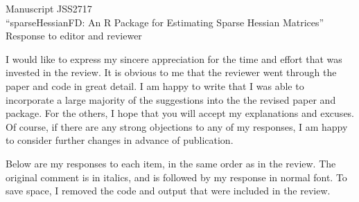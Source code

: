 \documentclass{article}
\begin{document}
{\bfseries
\begin{center}
  Manuscript JSS2717\\
 ``sparseHessianFD: An R Package for Estimating Sparse
 Hessian Matrices''\\
 \vspace{\baselineskip}
 Response to editor and reviewer
\end{center}
}
\vspace{\baselineskip}

I would like to express my sincere appreciation for the time and effort that
was invested in the review.  It is obvious to me that the reviewer went through
the paper and code in great detail.  I am happy to write that I was
able to incorporate a large majority of
the suggestions into the the revised paper and package. For the
others, I hope that you will accept my
explanations and excuses.  Of course, if there are any strong
objections to any of my responses, I am happy
to consider further changes in advance of publication.

Below are my responses to each item, in the same order as in the
review.  The original comment is in italics, and is followed by my
response in normal font.  To save space, I removed the code and output
that were included in the review.

\vspace{\baselineskip}
\end{document}

